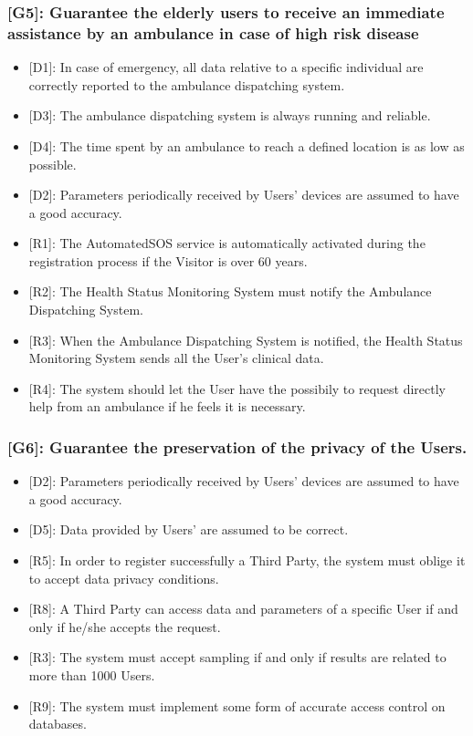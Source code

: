 \documentclass[12pt,a4paper]{article}
\begin{document}
	\subsubsection*{{[}{G5}{]}: Guarantee the elderly users to receive an immediate assistance by an ambulance in case of high risk disease}
	\begin{itemize}
		\begin{itemize}
			\item {[D1]}: In case of emergency, all data relative to a specific individual are correctly reported to the ambulance dispatching system.
			\item {[D3]}: The ambulance dispatching system is always running and reliable.
			\item {[D4]}: The time spent by an ambulance to reach a defined location is as low as possible.
			\item {[D2]}: Parameters periodically received by Users' devices are assumed to have a good accuracy. 
			
			\item {[R1]}: The AutomatedSOS service is automatically activated during the registration process if the Visitor is over 60 years.
			\item {[R2]}: The Health Status Monitoring System must notify the Ambulance Dispatching System. 
			\item {[R3]}: When the Ambulance Dispatching System is notified, the Health Status Monitoring System sends all the User's clinical data.
			\item {[R4]}: The system should let the User have the possibily to request directly help from an ambulance if he feels it is necessary.
		\end{itemize}
	\end{itemize}
	\subsubsection*{{[}{G6}{]}: Guarantee the preservation of the privacy of the Users.}
	\begin{itemize}
		\begin{itemize}
			\item {[D2]}: Parameters periodically received by Users' devices are assumed to have a good accuracy. 
			\item {[D5]}: Data provided by Users' are assumed to be correct. 
			
			\item {[R5]}: In order to register successfully a Third Party, the system must oblige it to accept data privacy conditions.
			\item {[R8]}: A Third Party can access data and parameters of a specific User if and only if he/she accepts the request.
			\item {[R3]}: The system must accept sampling if and only if results are related to more than 1000 Users.
			\item {[R9]}: The system must implement some form of accurate access control on databases.
		\end{itemize}
	\end{itemize}
\end{document}
